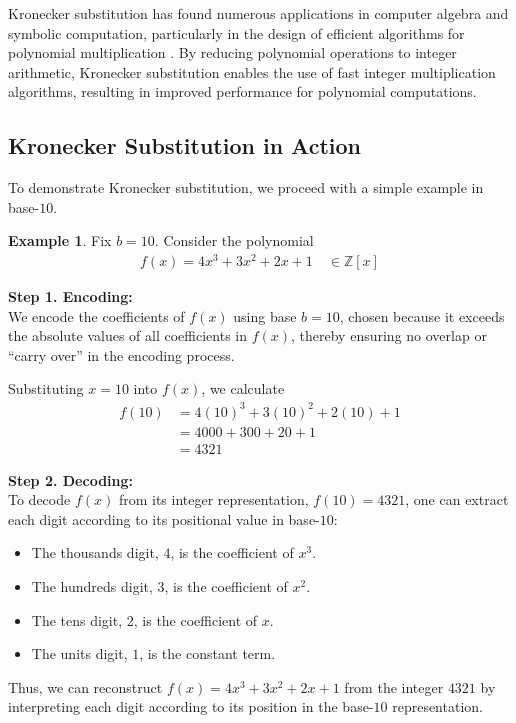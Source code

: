 \documentclass[11pt,reqno]{article}
\theoremstyle{plain}
\theoremstyle{definition}
\newtheorem{example}{Example}
\begin{document}
Kronecker substitution has found numerous applications in computer algebra and symbolic computation, particularly in the design of efficient algorithms for polynomial multiplication \cite{harvey2009kronecker, harvey2014faster}. By reducing polynomial operations to integer arithmetic, Kronecker substitution enables the use of fast integer multiplication algorithms, resulting in improved performance for polynomial computations.

\subsection{Kronecker Substitution in Action}
To demonstrate Kronecker substitution, we proceed with a simple example in base-$10$.

\begin{example}
Fix $b=10$. Consider the polynomial 
\begin{align*}
    f(x) = 4x^3 + 3x^2 + 2x + 1 \quad \in \mathbb{Z}[x]
\end{align*}

\textbf{Step 1. Encoding:} \\
We encode the coefficients of $f(x)$ using base $b=10$, chosen because it exceeds the absolute values of all coefficients in $f(x)$, thereby ensuring no overlap or ``carry over'' in the encoding process.

Substituting $x = 10$ into $f(x)$, we calculate
\begin{align*}
    f(10) &= 4(10)^3 + 3(10)^2 + 2(10) + 1 \\
    &= 4000 + 300 + 20 + 1 \\
    &= 4321
\end{align*}

\textbf{Step 2. Decoding:} \\
To decode $f(x)$ from its integer representation, $f(10) = 4321$, one can extract each digit according to its positional value in base-$10$:
\begin{itemize}
    \item The thousands digit, $4$, is the coefficient of $x^3$.
    \item The hundreds digit, $3$, is the coefficient of $x^2$.
    \item The tens digit, $2$, is the coefficient of $x$.
    \item The units digit, $1$, is the constant term.
\end{itemize}

Thus, we can reconstruct $f(x) = 4x^3 + 3x^2 + 2x + 1$ from the integer $4321$ by interpreting each digit according to its position in the base-$10$ representation.
\end{example}

\newpage
\small
\begingroup
\raggedright


\endgroup
\end{document}
